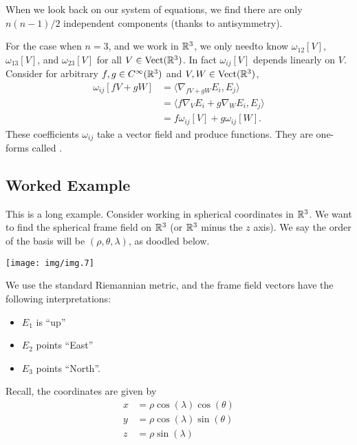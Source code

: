 When we look back on our system of equations, we find there are only
$n(n-1)/2$ independent components (thanks to antisymmetry).

\M
For the case when $n=3$, and we work in $\mathbb{R}^{3}$, we only needto know
$\omega_{12}[V]$, $\omega_{13}[V]$, and $\omega_{23}[V]$ for all
$V\in\operatorname{Vect}(\mathbb{R}^{3})$. In fact $\omega_{ij}[V]$ depends linearly on
$V$. Consider for arbitrary $f,g\in C^{\infty}(\mathbb{R}^{3})$ and
$V,W\in\operatorname{Vect}(\mathbb{R}^{3})$,
\begin{subequations}
  \begin{align}
    \omega_{ij}[fV + gW] &= \langle\nabla_{fV + gW}E_{i},E_{j}\rangle\\
    &= \langle f\nabla_{V}E_{i} + g\nabla_{W}E_{i},E_{j}\rangle\\
    &= f\omega_{ij}[V] + g\omega_{ij}[W].
  \end{align}
\end{subequations}
These coefficients $\omega_{ij}$ take a vector field and produce
functions. They are one-forms called .

\subsection{Worked Example}

\M This is a long example. Consider working in spherical coordinates in
$\mathbb{R}^{3}$. We want to find the spherical frame field on $\mathbb{R}^{3}$ (or
$\mathbb{R}^{3}$ minus the $z$ axis). We say the order of the basis will be
$(\rho,\theta,\lambda)$, as doodled below.
\begin{center}
  \texttt{[image: img/img.7]}
\end{center}
We use the standard Riemannian metric, and the frame field vectors have
the following interpretations:
\begin{itemize}
\item $E_{1}$ is ``up''
\item $E_{2}$ points ``East''
\item $E_{3}$ points ``North''.
\end{itemize}
Recall, the coordinates are given by
\begin{subequations}
  \begin{align}
x &=\rho\cos(\lambda)\cos(\theta)\\
y &=\rho\cos(\lambda)\sin(\theta)\\
z &= \rho\sin(\lambda)
  \end{align}
\end{subequations}

